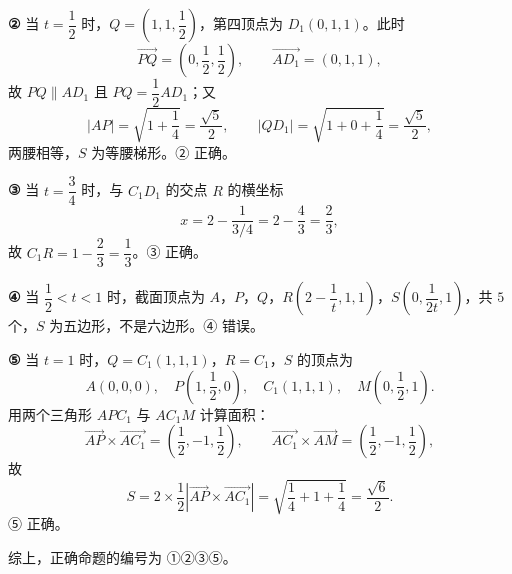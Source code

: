 \begin{answer}
\textbf{②} 当 $t=\dfrac12$ 时，$Q=\left(1,1,\dfrac12\right)$，第四顶点为 $D_1(0,1,1)$。此时
\nopagebreak[4]
\[\overrightarrow{PQ}=\left(0,\frac12,\frac12\right),\qquad \overrightarrow{AD_1}=(0,1,1),\]
故 $PQ\parallel AD_1$ 且 $PQ=\dfrac12AD_1$；又
\nopagebreak[4]
\[|AP|=\sqrt{1+\frac14}=\frac{\sqrt5}{2},\qquad |QD_1|=\sqrt{1+0+\frac14}=\frac{\sqrt5}{2},\]
两腰相等，$S$ 为等腰梯形。② 正确。

\textbf{③} 当 $t=\dfrac34$ 时，与 $C_1D_1$ 的交点 $R$ 的横坐标
\nopagebreak[4]
\[x=2-\frac{1}{3/4}=2-\frac43=\frac23,\]
故 $C_1R=1-\dfrac23=\dfrac13$。③ 正确。

\textbf{④} 当 $\dfrac12<t<1$ 时，截面顶点为 $A$，$P$，$Q$，$R\left(2-\dfrac1t,1,1\right)$，$S\left(0,\dfrac1{2t},1\right)$，共 $5$ 个，$S$ 为五边形，不是六边形。④ 错误。

\textbf{⑤} 当 $t=1$ 时，$Q=C_1(1,1,1)$，$R=C_1$，$S$ 的顶点为
\nopagebreak[4]
\[A(0,0,0),\quad P\left(1,\frac12,0\right),\quad C_1(1,1,1),\quad M\left(0,\frac12,1\right).\]
用两个三角形 $APC_1$ 与 $AC_1M$ 计算面积：
\nopagebreak[4]
\[\overrightarrow{AP}\times\overrightarrow{AC_1}
=\left(\frac12,-1,\frac12\right),\qquad
\overrightarrow{AC_1}\times\overrightarrow{AM}
=\left(\frac12,-1,\frac12\right),\]
故
\nopagebreak[4]
\[S=2\times\frac12\left|\overrightarrow{AP}\times\overrightarrow{AC_1}\right|
=\sqrt{\frac14+1+\frac14}=\frac{\sqrt6}{2}.\]
⑤ 正确。

综上，正确命题的编号为 ①②③⑤。


\end{answer}
